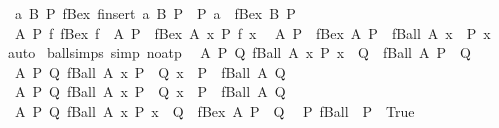 \begin{isabellebody}
\ \ {\isachardoublequoteopen}{\isasymAnd}a\ B\ P{\isachardot}\ fBex\ {\isacharparenleft}finsert\ a\ B{\isacharparenright}\ P\ {\isacharequal}\ {\isacharparenleft}P\ a\ {\isasymor}\ fBex\ B\ P{\isacharparenright}{\isachardoublequoteclose}\isanewline
\ \ {\isachardoublequoteopen}{\isasymAnd}A\ P\ f{\isachardot}\ fBex\ {\isacharparenleft}f\ {\isacharbar}{\isacharbackquote}{\isacharbar}\ A{\isacharparenright}\ P\ {\isacharequal}\ fBex\ A\ {\isacharparenleft}{\isasymlambda}x{\isachardot}\ P\ {\isacharparenleft}f\ x{\isacharparenright}{\isacharparenright}{\isachardoublequoteclose}\isanewline
\ \ {\isachardoublequoteopen}{\isasymAnd}A\ P{\isachardot}\ {\isacharparenleft}{\isasymnot}\ fBex\ A\ P{\isacharparenright}\ {\isacharequal}\ fBall\ A\ {\isacharparenleft}{\isasymlambda}x{\isachardot}\ {\isasymnot}\ P\ x{\isacharparenright}{\isachardoublequoteclose}\isanewline
%
\isadelimproof
%
\endisadelimproof
%
\isatagproof
{}\isamarkupfalse%
\ auto%
\endisatagproof
{\isafoldproof}%
%
\isadelimproof
\isanewline
%
\endisadelimproof
\isanewline
{}\isamarkupfalse%
\ ball{\isacharunderscore}simps\ {\isacharbrackleft}simp{\isacharcomma}\ no{\isacharunderscore}atp{\isacharbrackright}{\isacharcolon}\isanewline
\ \ {\isachardoublequoteopen}{\isasymAnd}A\ P\ Q{\isachardot}\ fBall\ A\ {\isacharparenleft}{\isasymlambda}x{\isachardot}\ P\ x\ {\isasymor}\ Q{\isacharparenright}\ {\isacharequal}\ {\isacharparenleft}fBall\ A\ P\ {\isasymor}\ Q{\isacharparenright}{\isachardoublequoteclose}\isanewline
\ \ {\isachardoublequoteopen}{\isasymAnd}A\ P\ Q{\isachardot}\ fBall\ A\ {\isacharparenleft}{\isasymlambda}x{\isachardot}\ P\ {\isasymor}\ Q\ x{\isacharparenright}\ {\isacharequal}\ {\isacharparenleft}P\ {\isasymor}\ fBall\ A\ Q{\isacharparenright}{\isachardoublequoteclose}\isanewline
\ \ {\isachardoublequoteopen}{\isasymAnd}A\ P\ Q{\isachardot}\ fBall\ A\ {\isacharparenleft}{\isasymlambda}x{\isachardot}\ P\ {\isasymlongrightarrow}\ Q\ x{\isacharparenright}\ {\isacharequal}\ {\isacharparenleft}P\ {\isasymlongrightarrow}\ fBall\ A\ Q{\isacharparenright}{\isachardoublequoteclose}\isanewline
\ \ {\isachardoublequoteopen}{\isasymAnd}A\ P\ Q{\isachardot}\ fBall\ A\ {\isacharparenleft}{\isasymlambda}x{\isachardot}\ P\ x\ {\isasymlongrightarrow}\ Q{\isacharparenright}\ {\isacharequal}\ {\isacharparenleft}fBex\ A\ P\ {\isasymlongrightarrow}\ Q{\isacharparenright}{\isachardoublequoteclose}\isanewline
\ \ {\isachardoublequoteopen}{\isasymAnd}P{\isachardot}\ fBall\ {\isacharbraceleft}{\isacharbar}{\isacharbar}{\isacharbraceright}\ P\ {\isacharequal}\ True{\isachardoublequoteclose}\isanewline

\end{isabellebody}
